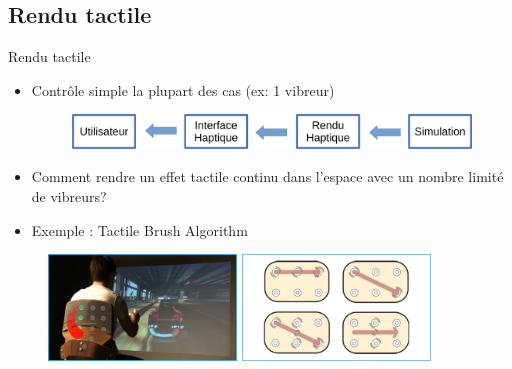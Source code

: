 \subsection{Rendu tactile}
\begin{frame}{Rendu tactile}
\begin{itemize}
\item Contrôle simple la plupart des cas (ex: 1 vibreur)
\begin{figure}
\centering
\includegraphics[width=\linewidth]{images/schema_haptique2}{}
\end{figure}
\item Comment rendre un effet tactile continu dans l'espace avec un nombre limité de vibreurs?
\end{itemize}
\begin{itemize}
\item Exemple : Tactile Brush Algorithm \cite{Israr2011}
\end{itemize}
\begin{figure}
\centering
\includegraphics[width=5cm]{images/immersive-tactile-experiences}
\includegraphics[width=5cm]{images/tactile-brush-algorithm}
\end{figure}
\end{frame}


